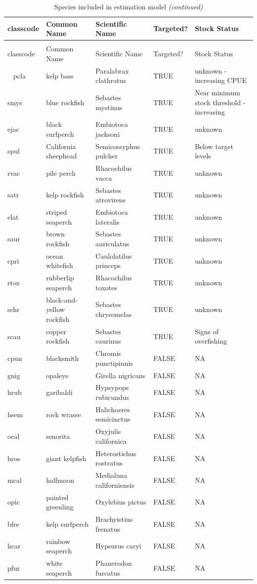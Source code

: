 \documentclass[]{article}
\begin{document}
\begin{longtable}[t]{lllll}
\caption{\label{tab:classcode}Species included in estimation model}\\
\toprule
classcode & Common Name & Scientific Name & Targeted? & Stock Status\\
\midrule
\endfirsthead
\caption[]{\label{tab:classcode}Species included in estimation model \textit{(continued)}}\\
\toprule
classcode & Common Name & Scientific Name & Targeted? & Stock Status\\
\midrule
\endhead
\
\endfoot
\bottomrule
\endlastfoot
pcla & kelp bass & Paralabrax clathratus & TRUE & unknown - increasing CPUE\\
smys & blue rockfish & Sebastes mystinus & TRUE & Near minimum stock threshold - increasing\\
ejac & black surfperch & Embiotoca jacksoni & TRUE & unknown\\
spul & California sheephead & Semicossyphus pulcher & TRUE & Below target levels\\
rvac & pile perch & Rhacochilus vacca & TRUE & unknown\\
\addlinespace
satr & kelp rockfish & Sebastes atrovirens & TRUE & unknown\\
elat & striped seaperch & Embiotoca lateralis & TRUE & unknown\\
saur & brown rockfish & Sebastes auriculatus & TRUE & unknown\\
cpri & ocean whitefish & Caulolatilus princeps & TRUE & unknown\\
rtox & rubberlip seaperch & Rhacochilus toxotes & TRUE & unknown\\
\addlinespace
schr & black-and-yellow rockfish & Sebastes chrysomelas & TRUE & unknown\\
scau & copper rockfish & Sebastes caurinus & TRUE & Signs of overfishing\\
cpun & blacksmith & Chromis punctipinnis & FALSE & NA\\
gnig & opaleye & Girella nigricans & FALSE & NA\\
hrub & garibaldi & Hypsypops rubicundus & FALSE & NA\\
\addlinespace
hsem & rock wrasse & Halichoeres semicinctus & FALSE & NA\\
ocal & senorita & Oxyjulis californica & FALSE & NA\\
hros & giant kelpfish & Heterostichus rostratus & FALSE & NA\\
mcal & halfmoon & Medialuna californiensis & FALSE & NA\\
opic & painted greenling & Oxylebius pictus & FALSE & NA\\
\addlinespace
bfre & kelp surfperch & Brachyistius frenatus & FALSE & NA\\
hcar & rainbow seaperch & Hypsurus caryi & FALSE & NA\\
pfur & white seaperch & Phanerodon furcatus & FALSE & NA\\*
\end{longtable}
\end{document}
